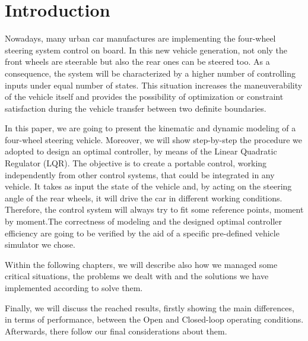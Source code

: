 
\chapter{Introduction}
	Nowadays, many urban car manufactures are implementing the four-wheel steering system control on board. In this new vehicle generation, not only the front wheels are steerable but also the rear ones can be steered too. As a consequence, the system will be characterized by a higher number of controlling inputs under equal number of states. This situation increases the maneuverability of the vehicle itself and provides the possibility of optimization or constraint satisfaction during the vehicle transfer between two definite boundaries.
	
	In this paper, we are going to present the kinematic and dynamic modeling of a four-wheel steering vehicle. Moreover, we will show step-by-step the procedure we adopted to design an optimal controller, by means of the Linear Quadratic Regulator (LQR). The objective is to create a portable control, working independently from other control systems, that could be integrated in any vehicle. It takes as input the state of the vehicle and, by acting on the steering angle of the rear wheels, it will drive the car in different working conditions. Therefore, the control system will always try to fit some reference points, moment by moment.The correctness of modeling and the designed optimal controller efficiency are going to be verified by the aid of a specific pre-defined vehicle simulator we chose.
	
	Within the following chapters, we will describe also how we managed some critical situations, the problems we dealt with and the solutions we have implemented according to solve them. 
	
	Finally, we will discuss the reached results, firstly showing the main differences, in terms of performance, between the Open and Closed-loop operating conditions. Afterwards, there follow our final considerations about them. 
